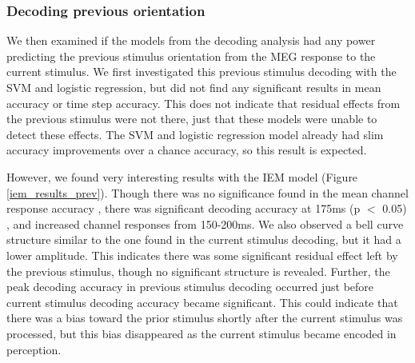 \documentclass[../main.tex]{subfiles}
\begin{document}
\subsubsection{Decoding previous orientation}
We then examined if the models from the decoding analysis had any power predicting the previous stimulus orientation from the MEG response to the current stimulus. We first investigated this previous stimulus decoding with the SVM and logistic regression, but did not find any significant results in mean accuracy or time step accuracy. This does not indicate that residual effects from the previous stimulus were not there, just that these models were unable to detect these effects. The SVM and logistic regression model already had slim accuracy improvements over a chance accuracy, so this result is expected.

However, we found very interesting results with the IEM model (Figure \ref{iem_results_prev}). Though there was no significance found in the mean channel response accuracy , there was significant decoding accuracy at 175ms (p $<$ 0.05) , and increased channel responses from 150-200ms. We also observed a bell curve structure similar to the one found in the current stimulus decoding, but it had a lower amplitude. This indicates there was some significant residual effect left by the previous stimulus, though no significant structure is revealed. Further, the peak decoding accuracy in previous stimulus decoding occurred just before current stimulus decoding accuracy became significant. This could indicate that there was a bias toward the prior stimulus shortly after the current stimulus was processed, but this bias disappeared as the current stimulus became encoded in perception.
\end{document}

